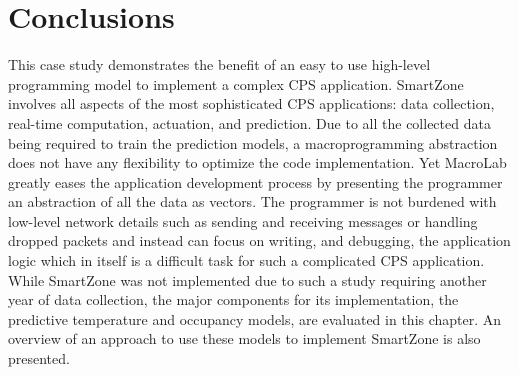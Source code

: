\section{Conclusions}
This case study demonstrates the benefit of an easy to use high-level
programming model to implement a complex CPS application. SmartZone involves all
aspects of the most sophisticated CPS applications: data collection, real-time
computation, actuation, and prediction. Due to all the collected data being
required to train the prediction models, a macroprogramming abstraction does not
have any flexibility to optimize the code implementation. Yet MacroLab greatly
eases the application development process by presenting the programmer an
abstraction of all the data as vectors. The programmer is not burdened with
low-level network details such as sending and receiving messages or handling
dropped packets and instead can focus on writing, and debugging, the application
logic which in itself is a difficult task for such a complicated CPS
application. While SmartZone was not implemented due to such a study requiring
another year of data collection, the major components for its implementation,
the predictive temperature and occupancy models, are evaluated in this
chapter. An overview of an approach to use these models to implement SmartZone
is also presented.



